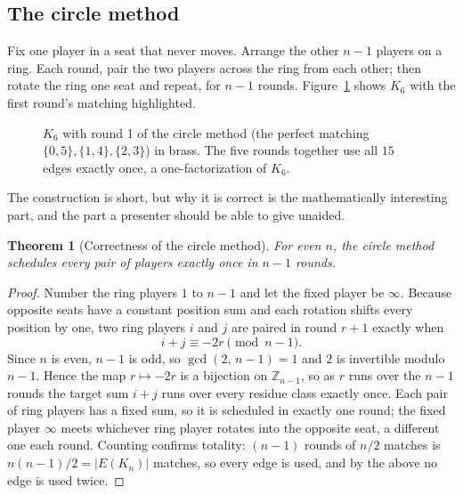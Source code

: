 \documentclass[11pt]{article}
\newtheorem{theorem}{Theorem}
\begin{document}
\subsection{The circle method}

Fix one player in a seat that never moves. Arrange the other $n-1$ players on a
ring. Each round, pair the two players across the ring from each other; then rotate
the ring one seat and repeat, for $n-1$ rounds. Figure~\ref{fig:kn} shows $K_6$
with the first round's matching highlighted.

\begin{figure}[h]
\centering
{}
\caption{$K_6$ with round 1 of the circle method (the perfect matching
$\{0,5\},\{1,4\},\{2,3\}$) in brass. The five rounds together use all $15$ edges
exactly once, a one-factorization of $K_6$.}
\label{fig:kn}
\end{figure}

The construction is short, but why it is correct is the mathematically interesting
part, and the part a presenter should be able to give unaided.

\begin{theorem}[Correctness of the circle method]
For even $n$, the circle method schedules every pair of players exactly once in
$n-1$ rounds.
\end{theorem}

\begin{proof}
Number the ring players $1$ to $n-1$ and let the fixed player be $\infty$. Because
opposite seats have a constant position sum and each rotation shifts every position
by one, two ring players $i$ and $j$ are paired in round $r+1$ exactly when
\[
i + j \equiv -2r \pmod{n-1}.
\]
Since $n$ is even, $n-1$ is odd, so $\gcd(2,\,n-1)=1$ and $2$ is invertible modulo
$n-1$. Hence the map $r \mapsto -2r$ is a bijection on $\mathbb{Z}_{n-1}$, so as $r$
runs over the $n-1$ rounds the target sum $i+j$ runs over every residue class
exactly once. Each pair of ring players has a fixed sum, so it is scheduled in
exactly one round; the fixed player $\infty$ meets whichever ring player rotates
into the opposite seat, a different one each round. Counting confirms totality:
$(n-1)$ rounds of $n/2$ matches is $n(n-1)/2 = |E(K_n)|$ matches, so every edge is
used, and by the above no edge is used twice.
\end{proof}
\end{document}
